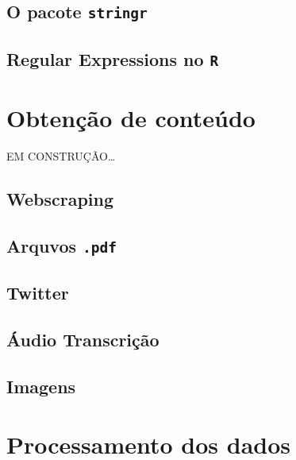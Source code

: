 \documentclass[]{book}
\begin{document}
\hypertarget{o-pacote-stringr}{%
\section{\texorpdfstring{O pacote \texttt{stringr}}{O pacote stringr}}\label{o-pacote-stringr}}

\hypertarget{regular-expressions-no-r}{%
\section{\texorpdfstring{Regular Expressions no \texttt{R}}{Regular Expressions no R}}\label{regular-expressions-no-r}}

\hypertarget{scrape}{%
\chapter{Obtenção de conteúdo}\label{scrape}}

EM CONSTRUÇÃO\ldots{}

\hypertarget{webscraping}{%
\section{Webscraping}\label{webscraping}}

\hypertarget{arquvos-.pdf}{%
\section{\texorpdfstring{Arquvos \texttt{.pdf}}{Arquvos .pdf}}\label{arquvos-.pdf}}

\hypertarget{twitter}{%
\section{Twitter}\label{twitter}}

\hypertarget{uxe1udio-transcriuxe7uxe3o}{%
\section{Áudio Transcrição}\label{uxe1udio-transcriuxe7uxe3o}}

\hypertarget{imagens}{%
\section{Imagens}\label{imagens}}

\hypertarget{processamento}{%
\chapter{Processamento dos dados}\label{processamento}}
\end{document}

